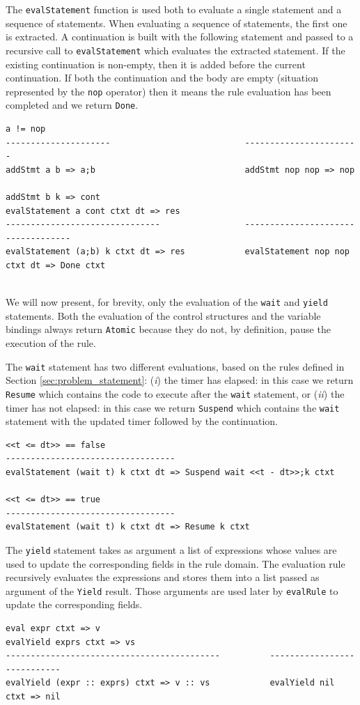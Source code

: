 \noindent
The \texttt{evalStatement} function is used both to evaluate a single statement and a sequence of statements. When evaluating a sequence of statements, the first one is extracted. A continuation is built with the following statement and passed to a recursive call to \texttt{evalStatement} which evaluates the extracted statement. If the existing continuation is non-empty, then it is added before the current continuation. If both the continuation and the body are empty (situation represented by the \texttt{nop} operator) then it means the rule evaluation has been completed and we return \texttt{Done}.

\begin{lstlisting}
a != nop
---------------------                           ----------------------- 
addStmt a b => a;b                              addStmt nop nop => nop   

addStmt b k => cont
evalStatement a cont ctxt dt => res
-------------------------------                 -----------------------------------       
evalStatement (a;b) k ctxt dt => res            evalStatement nop nop ctxt dt => Done ctxt


\end{lstlisting}

\noindent
We will now present, for brevity, only the evaluation of the \texttt{wait} and \texttt{yield} statements. Both the evaluation of the control structures and the variable bindings always return \texttt{Atomic} because they do not, by definition, pause the execution of the rule.

The \texttt{wait} statement has two different evaluations, based on the rules defined in Section \ref{sec:problem_statement}: (\textit{i}) the timer has elapsed: in this case we return \texttt{Resume} which contains the code to execute after the \texttt{wait} statement, or (\textit{ii}) the timer has not elapsed: in this case we return \texttt{Suspend} which contains the \texttt{wait} statement with the updated timer followed by the continuation.


\begin{lstlisting}
<<t <= dt>> == false
----------------------------------
evalStatement (wait t) k ctxt dt => Suspend wait <<t - dt>>;k ctxt

<<t <= dt>> == true
----------------------------------
evalStatement (wait t) k ctxt dt => Resume k ctxt
\end{lstlisting}

\noindent
The \texttt{yield} statement takes as argument a list of expressions whose values are used to update the corresponding fields in the rule domain. The evaluation rule recursively evaluates the expressions and stores them into a list passed as argument of the \texttt{Yield} result. Those arguments are used later by \texttt{evalRule} to update the corresponding fields.

\begin{lstlisting}
eval expr ctxt => v
evalYield exprs ctxt => vs
-------------------------------------------          ----------------------------
evalYield (expr :: exprs) ctxt => v :: vs            evalYield nil ctxt => nil
\end{lstlisting}